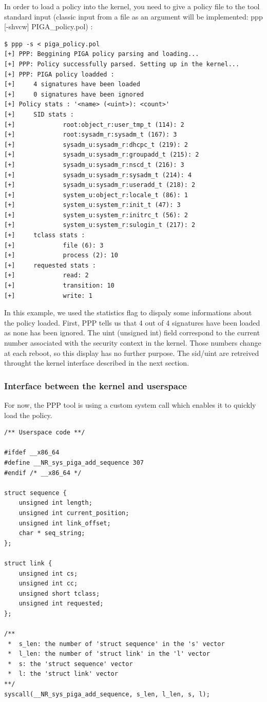 \documentclass[pdftex,a4paper,titlepage,11pt]{article}
\begin{document}
\smallskip

In order to load a policy into the kernel, you need to give a policy file to the tool standard input (classic input from a file as an argument will be implemented: ppp [-shvcw] PIGA\_policy.pol) :
\begin{lstlisting}
$ ppp -s < piga_policy.pol
[+] PPP: Beggining PIGA policy parsing and loading...
[+] PPP: Policy successfully parsed. Setting up in the kernel...
[+] PPP: PIGA policy loadded :
[+]     4 signatures have been loaded
[+]     0 signatures have been ignored
[+] Policy stats : '<name> (<uint>): <count>'
[+]     SID stats :
[+]             root:object_r:user_tmp_t (114): 2
[+]             root:sysadm_r:sysadm_t (167): 3
[+]             sysadm_u:sysadm_r:dhcpc_t (219): 2
[+]             sysadm_u:sysadm_r:groupadd_t (215): 2
[+]             sysadm_u:sysadm_r:nscd_t (216): 3
[+]             sysadm_u:sysadm_r:sysadm_t (214): 4
[+]             sysadm_u:sysadm_r:useradd_t (218): 2
[+]             system_u:object_r:locale_t (86): 1
[+]             system_u:system_r:init_t (47): 3
[+]             system_u:system_r:initrc_t (56): 2
[+]             system_u:system_r:sulogin_t (217): 2
[+]     tclass stats :
[+]             file (6): 3
[+]             process (2): 10
[+]     requested stats :
[+]             read: 2
[+]             transition: 10
[+]             write: 1
\end{lstlisting}

In this example, we used the statistics flag to dispaly some informations about the policy loaded. First, PPP tells us that 4 out of 4 signatures have been loaded as none has been ignored. The uint (unsigned int) field correspond to the current number associated with the security context in the kernel. Those numbers change at each reboot, so this display has no further purpose. The sid/uint are retreived throught the kernel interface described in the next section.

\subsubsection{Interface between the kernel and userspace}

For now, the PPP tool is using a custom system call which enables it to quickly load the policy.

\begin{lstlisting}
/** Userspace code **/

#ifdef __x86_64
#define __NR_sys_piga_add_sequence 307
#endif /* __x86_64 */

struct sequence {
	unsigned int length;
	unsigned int current_position;
	unsigned int link_offset;
	char * seq_string;
};

struct link {
	unsigned int cs;
	unsigned int cc;
	unsigned short tclass;
	unsigned int requested;
};

/**
 *  s_len: the number of 'struct sequence' in the 's' vector
 *  l_len: the number of 'struct link' in the 'l' vector
 *  s: the 'struct sequence' vector
 *  l: the 'struct link' vector
**/
syscall(__NR_sys_piga_add_sequence, s_len, l_len, s, l);
\end{lstlisting}
\end{document}
